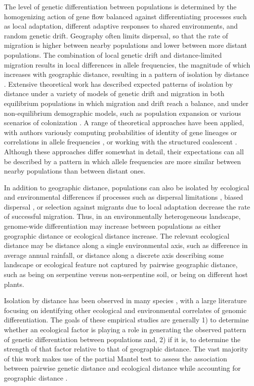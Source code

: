 The level of genetic differentiation between populations is determined by the homogenizing action of gene flow balanced against differentiating processes such as local adaptation, different adaptive responses to shared environments, and random genetic drift.  Geography often limits dispersal, so that the rate of migration is higher between nearby populations and lower between more distant populations.  The combination of local genetic drift and distance-limited migration results in local differences in allele frequencies, the magnitude of which increases with geographic distance, resulting in a pattern of isolation by distance \citep{Wright1943}. Extensive theoretical work has described expected patterns of isolation by distance under a variety of models of genetic drift and migration \citep{Charlesworth2003} in both equilibrium populations in which migration and drift reach a balance, and under non-equilibrium demographic models, such as population expansion or various scenarios of colonization \citep{Slatkin1993}.  A range of theoretical approaches have been applied, with authors variously computing probabilities of identity of gene lineages \citep[e.g.][]{Malecot1975, Rousset1997} or correlations in allele frequencies \citep[e.g.][]{SlatkinMaruyama1975, WeirCockerham1984}, or working with the structured coalescent \citep[e.g.][]{Hey1991, NordborgKrone2002}.  Although these approaches differ somewhat in detail, their expectations can all be described by a pattern in which allele frequencies are more similar between nearby populations than between distant ones.

In addition to geographic distance, populations can also be isolated by ecological and environmental differences if processes such as dispersal limitations \citep{Wright1943}, biased dispersal \citep[e.g.][]{EdelaarBolnick2012}, or selection against migrants due to local adaptation \citep{Wright1943, Hendry2004} decrease the rate of successful migration. Thus, in an environmentally heterogeneous landscape, genome-wide differentiation may increase between populations as either geographic distance or ecological distance increase.  The relevant ecological distance may be distance along a single environmental axis, such as difference in average annual rainfall, or distance along a discrete axis describing some landscape or ecological feature not captured by pairwise geographic distance, such as being on serpentine versus non-serpentine soil, or being on different host plants.  

Isolation by distance has been observed in many species \citep{VekemansHardy2004, Meirmans2012}, with a large literature focusing on identifying other ecological and environmental correlates of genomic differentiation.  The goals of these empirical studies are generally 1) to determine whether an ecological factor is playing a role in generating the observed pattern of genetic differentiation between populations and, 2) if it is, to determine the strength of that factor relative to that of geographic distance. The vast majority of this work makes use of the partial Mantel test to assess the association between pairwise genetic distance and ecological distance while accounting for geographic distance \citep{Smouse1986}. 

